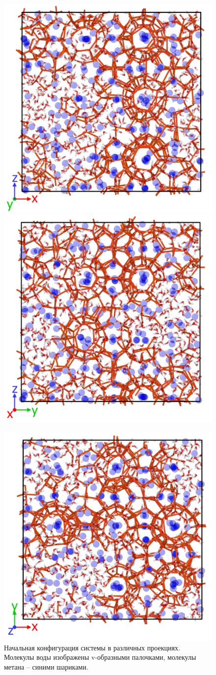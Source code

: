 \begin{figure}[H]
    \centering
    \begin{minipage}{\linewidth}
        \includegraphics[width=.49\linewidth]{figures/tip4p_melt4.png}
        \includegraphics[width=.49\linewidth]{figures/tip4p_melt5.png}
    \end{minipage}
    \begin{minipage}{\linewidth}
        \centering
        \includegraphics[width=.5\linewidth]{figures/tip4p_melt6.png}
    \end{minipage}
    \caption{Начальная конфигурация системы в различных проекциях. Молекулы воды изображены v-образными палочками, молекулы метана -- синими шариками.}
    \label{fig3.11}
\end{figure}

